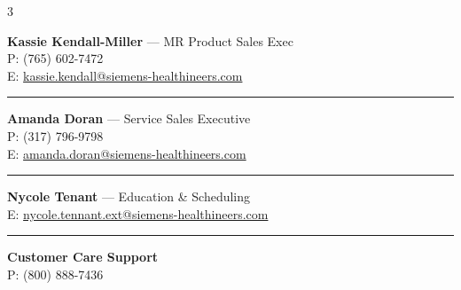 \documentclass[10pt,a4paper,landscape]{article}
\begin{document}
\begin{multicols}{3}
\begin{tcolorbox}
    \textbf{Kassie Kendall-Miller} \small{--- MR Product Sales Exec} \\
    \small{P: (765) 602-7472} \\
    \small{E: \href{mailto:kassie.kendall@siemens-healthineers.com}{kassie.kendall@siemens-healthineers.com}}

    \vspace{4pt}\hrule\vspace{4pt}

    \textbf{Amanda Doran} \small{--- Service Sales Executive} \\
    \small{P: (317) 796-9798} \\
    \small{E: \href{mailto:amanda.doran@siemens-healthineers.com}{amanda.doran@siemens-healthineers.com}}

    \vspace{4pt}\hrule\vspace{4pt}

    \textbf{Nycole Tenant} \small{--- Education \& Scheduling} \\
    \small{E: \href{mailto:nycole.tennant.ext@siemens-healthineers.com}{nycole.tennant.ext@siemens-healthineers.com}}

    \vspace{4pt}\hrule\vspace{4pt}

    \textbf{Customer Care Support} \\
    \small{P: (800) 888-7436}
\end{tcolorbox}

\end{multicols}
\end{document}
